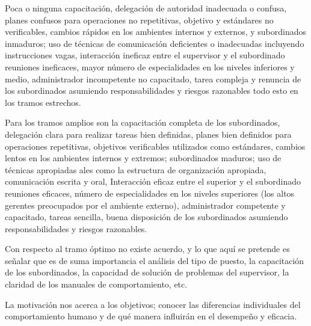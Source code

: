 Poca o ninguna capacitación, delegación de autoridad inadecuada o confusa, planes confusos para operaciones no repetitivas, objetivo y estándares no verificables, cambios rápidos en los ambientes internos y externos, y subordinados inmaduros; uso de técnicas de comunicación deficientes o inadecuadas incluyendo instrucciones vagas, interacción ineficaz entre el supervisor y el subordinado reuniones ineficaces, mayor número de especialidades en los niveles inferiores y medio, administrador incompetente no capacitado, tarea compleja y renuncia de los subordinados asumiendo responsabilidades y riesgos razonables todo esto en los tramos estrechos.

Para los tramos amplios son la capacitación completa de los subordinados, delegación clara para realizar tareas bien definidas, planes bien definidos para operaciones repetitivas, objetivos verificables utilizados como estándares, cambios lentos en los ambientes internos y extremos; subordinados maduros; uso de técnicas apropiadas ales como la estructura de organización apropiada, comunicación escrita y oral, Interacción eficaz entre el superior y el subordinado reuniones eficaces, número de especialidades en los niveles superiores (los altos gerentes preocupados por el ambiente externo), administrador competente y capacitado, tareas sencilla, buena disposición de los subordinados asumiendo responsabilidades y riesgos razonables.

Con respecto al tramo óptimo no existe acuerdo, y lo que aquí se pretende es señalar que es de suma importancia el análisis del tipo de puesto, la capacitación de los subordinados, la capacidad de solución de problemas del supervisor, la claridad de los manuales de comportamiento, etc.

La motivación nos acerca a los objetivos; conocer las diferencias individuales del comportamiento humano y de qué manera influirán en el desempeño y eficacia.


































